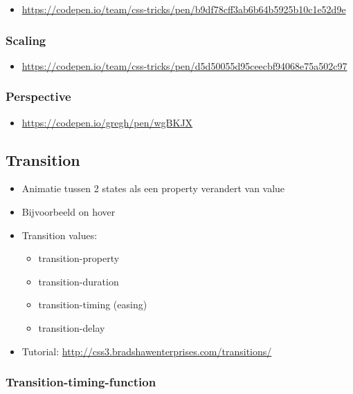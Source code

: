 \documentclass{article}
\begin{document}
\begin{itemize}
    \item \url{https://codepen.io/team/css-tricks/pen/b9df78cff3ab6b64b5925b10c1e52d9e}
\end{itemize}

\subsubsection{Scaling}

\begin{itemize}
    \item \url{https://codepen.io/team/css-tricks/pen/d5d50055d95ceecbf94068e75a502c97}
\end{itemize}

\subsubsection{Perspective}
\begin{itemize}
    \item \url{https://codepen.io/gregh/pen/wgBKJX}
\end{itemize}

\subsection{Transition}
\begin{itemize}
    \item Animatie tussen 2 states als een property verandert van value
    \item Bijvoorbeeld on hover
    \item Transition values:
    \begin{itemize}
        \item transition-property
        \item transition-duration
        \item transition-timing (easing)
        \item transition-delay
    \end{itemize}
    \item Tutorial: \url{http://css3.bradshawenterprises.com/transitions/}
\end{itemize}

\subsubsection{Transition-timing-function}
\end{document}
